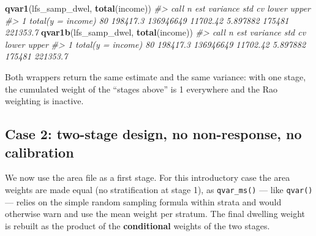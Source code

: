 \documentclass[
]{article}
\newenvironment{Shaded}{\begin{snugshade}}{\end{snugshade}}
\newcommand{\AttributeTok}[1]{\textcolor[rgb]{0.13,0.29,0.53}{#1}}
\newcommand{\CommentTok}[1]{\textcolor[rgb]{0.56,0.35,0.01}{\textit{#1}}}
\newcommand{\DecValTok}[1]{\textcolor[rgb]{0.00,0.00,0.81}{#1}}
\newcommand{\FunctionTok}[1]{\textcolor[rgb]{0.13,0.29,0.53}{\textbf{#1}}}
\newcommand{\NormalTok}[1]{#1}
\newcommand{\OtherTok}[1]{\textcolor[rgb]{0.56,0.35,0.01}{#1}}
\newcommand{\SpecialCharTok}[1]{\textcolor[rgb]{0.81,0.36,0.00}{\textbf{#1}}}
\newcommand{\StringTok}[1]{\textcolor[rgb]{0.31,0.60,0.02}{#1}}
\begin{document}
\begin{Shaded}
\begin{Highlighting}[]
\FunctionTok{qvar1}\NormalTok{(lfs\_samp\_dwel, }\FunctionTok{total}\NormalTok{(income))}
\CommentTok{\#\textgreater{}                call  n      est  variance      std       cv  lower    upper}
\CommentTok{\#\textgreater{} 1 total(y = income) 80 198417.3 136946649 11702.42 5.897882 175481 221353.7}
\FunctionTok{qvar1b}\NormalTok{(lfs\_samp\_dwel, }\FunctionTok{total}\NormalTok{(income))}
\CommentTok{\#\textgreater{}                call  n      est  variance      std       cv  lower    upper}
\CommentTok{\#\textgreater{} 1 total(y = income) 80 198417.3 136946649 11702.42 5.897882 175481 221353.7}
\end{Highlighting}
\end{Shaded}

Both wrappers return the same estimate and the same variance: with one
stage, the cumulated weight of the ``stages above'' is 1 everywhere and
the Rao weighting is inactive.

\subsection{Case 2: two-stage design, no non-response, no
calibration}\label{case-2-two-stage-design-no-non-response-no-calibration}

We now use the area file as a first stage. For this introductory case
the area weights are made equal (no stratification at stage 1), as
\texttt{qvar\_ms()} --- like \texttt{qvar()} --- relies on the simple
random sampling formula within strata and would otherwise warn and use
the mean weight per stratum. The final dwelling weight is rebuilt as the
product of the \textbf{conditional} weights of the two stages.

\begin{Shaded}
\end{Shaded}
\end{document}
